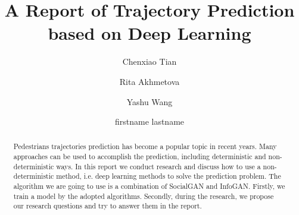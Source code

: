 \documentclass[sigconf]{acmart}
\begin{document}
\title{A Report of Trajectory Prediction based on Deep Learning}


\author{Chenxiao Tian}

\author{Rita Akhmetova}

\author{Yashu Wang}

\author{firstname lastname}
\affiliation{\institution{}}

\renewcommand{\shortauthors}{team 4: Trajectory Prediction}







\begin{abstract}

Pedestrians trajectories prediction has become a popular topic in recent years. Many approaches can be used to accomplish the prediction, including deterministic and non-deterministic ways. In this report we conduct research and discuss how to use a non-deterministic method, i.e. deep learning methods to solve the prediction problem. The algorithm we are going to use is a combination of SocialGAN and InfoGAN. Firstly, we train a model by the adopted algorithms. Secondly, during the research, we propose our research questions and try to answer them in the report.
\end{abstract}
\end{document}
